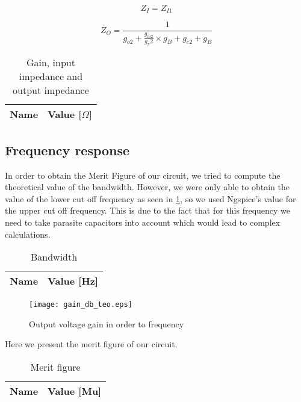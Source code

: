\begin{equation} \label{eq13}
Z_I=Z_{I1}
\end{equation}

\begin{equation} \label{eq13}
Z_O=\frac{1}{g_{o2}+\frac{g_{m2}}{g_\pi 2}\times g_B+g_{e2}+g_B}
\end{equation}

\begin{table}[h]
  \centering
  \begin{tabular}{|l|r|}
    \hline    
    {\bf Name} & {\bf Value [$\Omega$]} \\ \hline
    
  \end{tabular}
  \caption{Gain, input impedance and output impedance}
  \label{tab:OP}
\end{table}
\FloatBarrier

\subsection{Frequency response}
In order to obtain the Merit Figure of our circuit, we tried to compute the theoretical value of the bandwidth. However, we were only able to obtain the value of the lower cut off frequency as seen in \ref{fig:gain}, so we used Ngspice's value for the upper cut off frequency. This is due to the fact that for this frequency we need to take parasite capacitors into account which would lead to complex calculations.

\begin{table}[h]
  \centering
  \begin{tabular}{|l|r|}
    \hline    
    {\bf Name} & {\bf Value [Hz]} \\ \hline
    
  \end{tabular}
  \caption{Bandwidth}
  \label{tab:OP}
\end{table}
\FloatBarrier

\begin{figure}[h] \centering
\texttt{[image: gain\_db\_teo.eps]}
\caption{Output voltage gain in order to frequency}
\label{fig:gain}
\end{figure}
\FloatBarrier

Here we present the merit figure of our circuit.

\begin{table}[h]
  \centering
  \begin{tabular}{|l|r|}
    \hline    
    {\bf Name} & {\bf Value [Mu]} \\ \hline
    
  \end{tabular}
  \caption{Merit figure}
  \label{tab:OP}
\end{table}
\FloatBarrier
